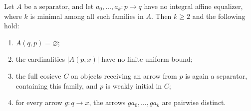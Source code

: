 \begin{proposition}
\label{C:lead9}
Let $A$ be a separator, and let
$a_0,\ldots,a_k:p\to q$ have no integral affine equalizer,
where $k$ is minimal among all such families in $A$. Then
$k\geq2$ and the following hold:
\begin{enumerate}[label=(\alph*)]
\item $A(q,p)=\varnothing$;
\item the cardinalities $|A(p,x)|$ have no finite uniform bound;
\item the full cosieve $C$ on objects receiving an arrow from $p$
is again a separator, containing this family, and $p$ is weakly
initial in $C$;
\item for every arrow $g:q\to x$, the arrows
$ga_0,\ldots,ga_k$ are pairwise distinct.
\end{enumerate}
\end{proposition}
